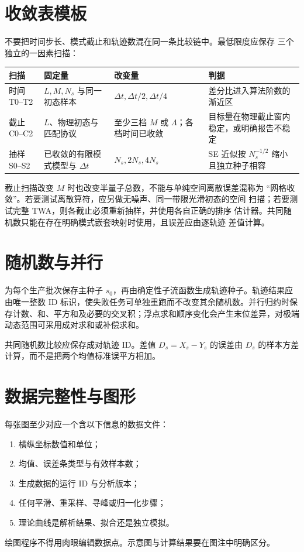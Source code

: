 \section{收敛表模板}

不要把时间步长、模式截止和轨迹数混在同一条比较链中。最低限度应保存
三个独立的一因素扫描：
\begin{center}
\begin{tabularx}{\textwidth}{>{\raggedright\arraybackslash}p{}>{\raggedright\arraybackslash}p{}>{\raggedright\arraybackslash}p{}>{\raggedright\arraybackslash}X}
\toprule
扫描 & 固定量 & 改变量 & 判据 \\
\midrule
时间 T0--T2 & $L,M,N_s$ 与同一初态样本 &
$\Delta t,\Delta t/2,\Delta t/4$ & 差分比进入算法阶数的渐近区 \\
截止 C0--C2 & $L$、物理初态与匹配协议 &
至少三档 $M$ 或 $\Lambda$；各档时间已收敛 & 目标量在物理截止窗内稳定，或明确报告不稳定 \\
抽样 S0--S2 & 已收敛的有限模式模型与 $\Delta t$ &
$N_s,2N_s,4N_s$ & SE 近似按 $N_s^{-1/2}$ 缩小且独立种子相容 \\
\bottomrule
\end{tabularx}
\end{center}
截止扫描改变 $M$ 时也改变半量子总数，不能与单纯空间离散误差混称为
“网格收敛”。若要测试离散算符，应另做无噪声、同一带限光滑初态的空间
扫描；若要测试完整 TWA，则各截止必须重新抽样，并使用各自正确的排序
估计器。共同随机数只能在存在明确模式嵌套映射时使用，且误差应由逐轨迹
差值计算。

\section{随机数与并行}

为每个生产批次保存主种子 $s_0$，再由确定性子流函数生成轨迹种子。轨迹结果应由唯一整数 ID 标识，使失败任务可单独重跑而不改变其余随机数。并行归约时保存计数、和、平方和及必要的交叉积；浮点求和顺序变化会产生末位差异，对极端动态范围可采用成对求和或补偿求和。

共同随机数比较应保存成对轨迹 ID。差值 $D_s=X_s-Y_s$ 的误差由 $D_s$ 的样本方差计算，而不是把两个均值标准误平方相加。

\section{数据完整性与图形}

每张图至少对应一个含以下信息的数据文件：
\begin{enumerate}
  \item 横纵坐标数值和单位；
  \item 均值、误差条类型与有效样本数；
  \item 生成数据的运行 ID 与分析版本；
  \item 任何平滑、重采样、寻峰或归一化步骤；
  \item 理论曲线是解析结果、拟合还是独立模拟。
\end{enumerate}
绘图程序不得用肉眼编辑数据点。示意图与计算结果要在图注中明确区分。

